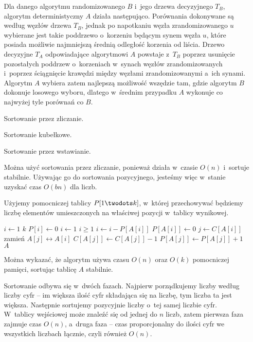 \subproblem %
Dla danego algorytmu randomizowanego $B$ i~jego drzewa decyzyjnego $T_B$, algorytm deterministyczny $A$ działa następująco. Porównania dokonywane są według węzłów drzewa $T_B$, jednak po napotkaniu węzła zrandomizowanego $u$ wybierane jest takie poddrzewo o~korzeniu będącym synem węzła $u$, które posiada możliwie najmniejszą średnią odległość korzenia od liścia. Drzewo decyzyjne $T_A$ odpowiadające algorytmowi $A$ powstaje z~$T_B$ poprzez usunięcie pozostałych poddrzew o~korzeniach w~synach węzłów zrandomizowanych i~poprzez ściągnięcie krawędzi między węzłami zrandomizowanymi a~ich synami. Algorytm $A$ wybiera zatem najlepszą możliwość wszędzie tam, gdzie algorytm $B$ dokonuje losowego wyboru, dlatego w~średnim przypadku $A$ wykonuje co najwyżej tyle porównań co $B$.


\subproblem %
Sortowanie przez zliczanie.

\subproblem %
Sortowanie kubełkowe.

\subproblem %
Sortowanie przez wstawianie.

\subproblem %
Można użyć sortowania przez zliczanie, ponieważ działa w~czasie $O(n)$ i~sortuje stabilnie. Używając go do sortowania pozycyjnego, jesteśmy więc w~stanie uzyskać czas $O(bn)$ dla  liczb.

\subproblem %
Użyjemy pomocniczej tablicy $P[1\twodots k]$, w~której przechowywać będziemy liczbę elementów umieszczonych na właściwej pozycji w~tablicy wynikowej.
\begin{codebox}
\li	\For $i\gets1$ \To $k$
\li		\Do $P[i]\gets0$
		\End
\li	$i\gets1$
\li	\While $i\ge1$
\li		\Do
			$i\gets i-P[A[i]]$
\li			$P[A[i]]\gets0$
\li			$j\gets C[A[i]]$
\li			zamień $A[j]\leftrightarrow A[i]$
\li			$C[A[j]]\gets C[A[j]]-1$
\li			$P[A[j]]\gets P[A[j]]+1$
		\End
\li	\Return $A$
\end{codebox}

Można wykazać, że algorytm używa czasu $O(n)$ oraz $O(k)$ pomocniczej pamięci, sortując tablicę $A$ stabilnie.


\subproblem %
Sortowanie odbywa się w~dwóch fazach. Najpierw porządkujemy liczby według liczby cyfr -- im większa ilość cyfr składająca się na liczbę, tym liczba ta jest większa. Następnie sortujemy pozycyjnie liczby o~tej samej liczbie cyfr. W~tablicy wejściowej może znaleźć się od jednej do $n$ liczb, zatem pierwsza faza zajmuje czas $O(n)$, a~druga faza -- czas proporcjonalny do ilości cyfr we wszystkich liczbach łącznie, czyli również $O(n)$.

